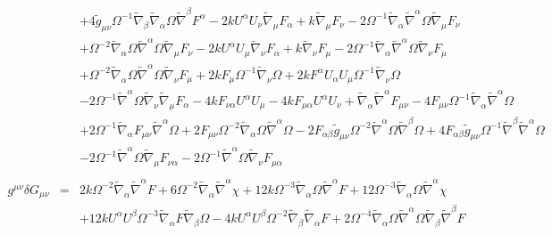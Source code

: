 \documentclass[10pt,letterpaper]{article}
\numberwithin{equation}{section}
\begin{document}
\begin{eqnarray}
&& + 4 \tilde{g}_{\mu \nu } \Omega^{-1} \tilde{\nabla}_{\beta }\tilde{\nabla}_{\alpha }\Omega \tilde{\nabla}^{\beta }F^{\alpha } - 2 k U^{\alpha } U_{\nu } \tilde{\nabla}_{\mu }F_{\alpha } + k \tilde{\nabla}_{\mu }F_{\nu } - 2 \Omega^{-1} \tilde{\nabla}_{\alpha }\tilde{\nabla}^{\alpha }\Omega \tilde{\nabla}_{\mu }F_{\nu } \nonumber \\ 
&& + \Omega^{-2} \tilde{\nabla}_{\alpha }\Omega \tilde{\nabla}^{\alpha }\Omega \tilde{\nabla}_{\mu }F_{\nu } - 2 k U^{\alpha } U_{\mu } \tilde{\nabla}_{\nu }F_{\alpha } + k \tilde{\nabla}_{\nu }F_{\mu } - 2 \Omega^{-1} \tilde{\nabla}_{\alpha }\tilde{\nabla}^{\alpha }\Omega \tilde{\nabla}_{\nu }F_{\mu } \nonumber \\ 
&& + \Omega^{-2} \tilde{\nabla}_{\alpha }\Omega \tilde{\nabla}^{\alpha }\Omega \tilde{\nabla}_{\nu }F_{\mu } + 2 k F_{\mu } \Omega^{-1} \tilde{\nabla}_{\nu }\Omega + 2 k F^{\alpha } U_{\alpha } U_{\mu } \Omega^{-1} \tilde{\nabla}_{\nu }\Omega \nonumber \\ 
&& - 2 \Omega^{-1} \tilde{\nabla}^{\alpha }\Omega \tilde{\nabla}_{\nu }\tilde{\nabla}_{\mu }F_{\alpha }-4 k F_{\nu \alpha } U^{\alpha } U_{\mu } - 4 k F_{\mu \alpha } U^{\alpha } U_{\nu } + \tilde{\nabla}_{\alpha }\tilde{\nabla}^{\alpha }F_{\mu \nu } - 4 F_{\mu \nu } \Omega^{-1} \tilde{\nabla}_{\alpha }\tilde{\nabla}^{\alpha }\Omega \nonumber \\ 
&& + 2 \Omega^{-1} \tilde{\nabla}_{\alpha }F_{\mu \nu } \tilde{\nabla}^{\alpha }\Omega + 2 F_{\mu \nu } \Omega^{-2} \tilde{\nabla}_{\alpha }\Omega \tilde{\nabla}^{\alpha }\Omega - 2 F_{\alpha \beta } \tilde{g}_{\mu \nu } \Omega^{-2} \tilde{\nabla}^{\alpha }\Omega \tilde{\nabla}^{\beta }\Omega + 4 F_{\alpha \beta } \tilde{g}_{\mu \nu } \Omega^{-1} \tilde{\nabla}^{\beta }\tilde{\nabla}^{\alpha }\Omega \nonumber \\ 
&& - 2 \Omega^{-1} \tilde{\nabla}^{\alpha }\Omega \tilde{\nabla}_{\mu }F_{\nu \alpha } - 2 \Omega^{-1} \tilde{\nabla}^{\alpha }\Omega \tilde{\nabla}_{\nu }F_{\mu \alpha }
\\  \nonumber\\ 
g^{\mu\nu}\delta G_{\mu\nu}&=& 2 k \Omega^{-2} \tilde{\nabla}_{\alpha }\tilde{\nabla}^{\alpha }F + 6 \Omega^{-2} \tilde{\nabla}_{\alpha }\tilde{\nabla}^{\alpha }\chi + 12 k \Omega^{-3} \tilde{\nabla}_{\alpha }\Omega \tilde{\nabla}^{\alpha }F + 12 \Omega^{-3} \tilde{\nabla}_{\alpha }\Omega \tilde{\nabla}^{\alpha }\chi \nonumber \\ 
&& + 12 k U^{\alpha } U^{\beta } \Omega^{-3} \tilde{\nabla}_{\alpha }F \tilde{\nabla}_{\beta }\Omega - 4 k U^{\alpha } U^{\beta } \Omega^{-2} \tilde{\nabla}_{\beta }\tilde{\nabla}_{\alpha }F + 2 \Omega^{-4} \tilde{\nabla}_{\alpha }\Omega \tilde{\nabla}^{\alpha }\Omega \tilde{\nabla}_{\beta }\tilde{\nabla}^{\beta }F \nonumber \\ 

\end{eqnarray}
\end{document}
